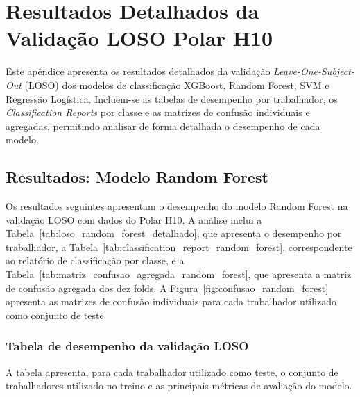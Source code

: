 
\chapter{Resultados Detalhados da Validação LOSO Polar H10}
\label{AppendixC}

\renewcommand{\thetable}{\thesubsection}
\renewcommand{\thefigure}{\thesubsection}

Este apêndice apresenta os resultados detalhados da validação \textit{Leave-One-Subject-Out} (LOSO) dos modelos de classificação XGBoost, Random Forest, SVM e Regressão Logística. Incluem-se as tabelas de desempenho por trabalhador, os \textit{Classification Reports} por classe e as matrizes de confusão individuais e agregadas, permitindo analisar de forma detalhada o desempenho de cada modelo.

\section{Resultados: Modelo Random Forest}

Os resultados seguintes apresentam o desempenho do modelo Random Forest na validação LOSO com dados do Polar H10. A análise inclui a Tabela~\ref{tab:loso_random_forest_detalhado}, que apresenta o desempenho por trabalhador, a Tabela~\ref{tab:classification_report_random_forest}, correspondente ao relatório de classificação por classe, e a Tabela~\ref{tab:matriz_confusao_agregada_random_forest}, que apresenta a matriz de confusão agregada dos dez folds. A Figura~\ref{fig:confusao_random_forest} apresenta as matrizes de confusão individuais para cada trabalhador utilizado como conjunto de teste.

\subsection{Tabela de desempenho da validação LOSO}

A tabela apresenta, para cada trabalhador utilizado como teste, o conjunto de trabalhadores utilizado no treino e as principais métricas de avaliação do modelo.


